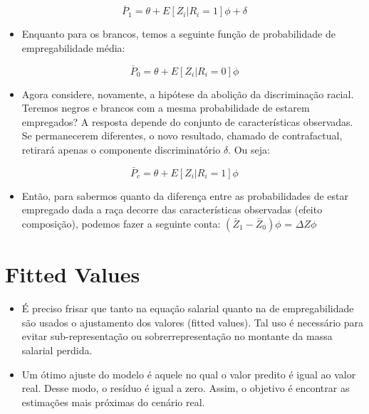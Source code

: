 \documentclass{article}
\begin{document}
	\begin{equation}
		\bar{P}_{1} = \theta + E[Z_{i}|R_{i} = 1]\phi + \delta
	\end{equation}

\begin{itemize}
	\item Enquanto para os brancos, temos a seguinte função de probabilidade de empregabilidade média:
\end{itemize}

	\begin{equation}
	\bar{P}_{0} = \theta + E[Z_{i}|R_{i} = 0]\phi 
\end{equation}

\begin{itemize}
	\item Agora considere, novamente, a hipótese da abolição da discriminação racial. Teremos negros e brancos com a mesma probabilidade de estarem empregados? A resposta depende do conjunto de características observadas. Se permanecerem diferentes, o novo resultado, chamado de contrafactual, retirará apenas o componente discriminatório $\delta$. Ou seja:
\end{itemize}

	\begin{equation}
	\bar{P}_{c} = \theta + E[Z_{i}|R_{i} = 1]\phi 
\end{equation}

\begin{itemize}
	\item Então, para sabermos quanto da diferença entre as probabilidades de estar empregado dada a raça decorre das características observadas (efeito composição), podemos fazer a seguinte conta: $(\bar{Z}_{1} - \bar{Z}_{0})\phi$ = $\Delta Z\phi$
\end{itemize}

\section{Fitted Values}
\begin{itemize}
	\item É preciso frisar que tanto na equação salarial quanto na de empregabilidade são usados o ajustamento dos valores (fitted values). Tal uso é necessário para evitar sub-representação ou sobrerrepresentação no montante da massa salarial perdida.
	\item Um ótimo ajuste do modelo é aquele no qual o valor predito é igual ao valor real. Desse modo, o resíduo é igual a zero. Assim, o objetivo é encontrar as estimações mais próximas do cenário real.
\end{itemize}
\end{document}
